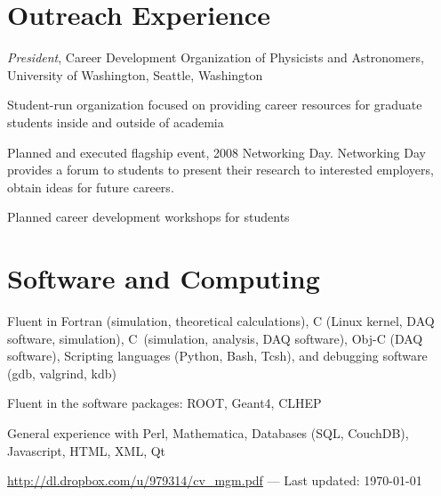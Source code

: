 \documentclass[11pt, a4paper]{article}
\newcommand{\virginyears}[1]{\marginpar{\scriptsize #1}}
\newcommand{\years}[1]{\noindent\virginyears{#1}}
\newcommand{\cpp}{C\protect\raisebox{.25ex}{++}\ }
\newenvironment{packed_enum}{
\begin{itemize}[topsep=0pt]
  \renewcommand{\labelitemi}{$\cdot$}
  \setlength{\itemsep}{1pt}
  \setlength{\parskip}{0pt}
  \setlength{\parsep}{0pt}
}{\end{itemize}}
\begin{document}
\section*{Outreach Experience}
\years{2008-2009}\emph{President}, Career Development Organization of Physicists and Astronomers, University of Washington, Seattle, Washington
\begin{packed_enum}
\item Student-run organization focused on providing career resources for graduate students inside and outside of academia  
\item Planned and executed flagship event, 2008 Networking Day.  Networking Day provides a forum to students to present their research to interested employers, obtain ideas for future careers.
\item Planned career development workshops for students
\end{packed_enum}

\section*{Software and Computing}
\begin{packed_enum}
\item Fluent in Fortran (simulation, theoretical calculations), C (Linux kernel, DAQ software, simulation), \cpp (simulation, analysis, DAQ software), Obj-C (DAQ software), Scripting languages (Python, Bash, Tcsh), and debugging software (gdb, valgrind, kdb)
\item Fluent in the software packages: ROOT, Geant4, CLHEP
\item General experience with Perl, Math\-ematica, Databases (SQL, CouchDB), Ja\-va\-script, HTML, XML, Qt
\end{packed_enum}
\vfill{}
\hrulefill

\begin{center}
{\footnotesize \href{http://dl.dropbox.com/u/979314/cv_mgm.pdf}{http://dl.dropbox.com/u/979314/cv\_mgm.pdf} — Last updated: \usvardate\today
}
\end{center}
\end{document}
